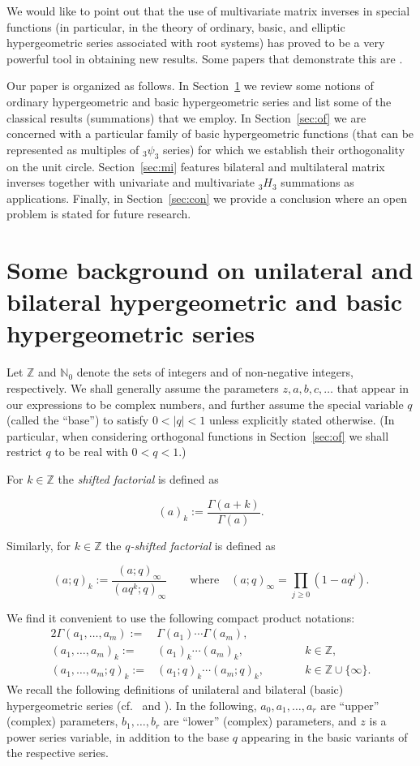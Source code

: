 \documentclass[reqno,12pt]{amsart}
\theoremstyle{remark}
\numberwithin{equation}{section}
\newcommand{\Ga}{\Gamma}
\newcommand{\N}{\mathbb N}
\newcommand{\Z}{\mathbb Z}
\begin{document}
We would like to point out that the use of multivariate matrix inverses
in special functions (in particular, in the theory of ordinary, basic,
and elliptic hypergeometric series associated with root systems)
has proved to be a very powerful tool in obtaining new results.
Some papers that demonstrate this are
\cite{B,BM,BS,C,CG,DJ,KS,LS1,LS2,LM,M2,ML,R,Ro,RS,S1,S2,S5,S6,S7,SW,ZW}.

Our paper is organized as follows. In Section~\ref{sec:sb}
we review some notions of ordinary hypergeometric and basic
hypergeometric series and list some of the classical results (summations)
that we employ. In Section~\ref{sec:of} we are concerned with a
particular family of basic hypergeometric functions (that can be represented
as multiples of $_3\psi_3$ series) for which we establish their orthogonality
on the unit circle. Section~\ref{sec:mi} features bilateral and
multilateral matrix inverses together with univariate and multivariate
$_3H_3$ summations as applications. Finally, in Section~\ref{sec:con}
we provide a conclusion where an open problem is stated for future
research.

\section{Some background on unilateral and bilateral
hypergeometric and basic hypergeometric series}\label{sec:sb}
Let $\Z$ and $\N_0$ denote the sets of integers and of non-negative integers,
respectively. We shall generally assume the parameters $z,a,b,c,\ldots$
that appear in our expressions to be complex numbers,
and further assume the special variable $q$ (called the ``base'')
to satisfy $0<|q|<1$ unless explicitly stated otherwise.
(In particular, when considering orthogonal functions in
Section~\ref{sec:of} we shall restrict $q$ to be real
with $0<q<1$.)

For $k\in\Z$
the \textit{shifted factorial} is defined as

\[
(a)_k:=\frac{\Gamma(a+k)}{\Gamma(a)}.
\]

Similarly, for $k\in\Z$
the \textit{$q$-shifted factorial} is defined as

\[
(a;q)_k:=\frac{(a;q)_\infty}{(aq^k;q)_\infty}\qquad\text{where}\quad
(a;q)_\infty=\prod_{j\ge 0}(1-a q^j).
\]

We find it convenient to use the following compact product notations:
\begin{alignat*}{2}
\Ga(a_1,\dots,a_m):={}&\Ga(a_1)\dotsm\Ga(a_m),&&\\
(a_1,\dots,a_m)_k:={}&(a_1)_k\dotsm(a_m)_k, &&k\in\Z,\\
(a_1,\dots,a_m;q)_k:={}&(a_1;q)_k\dotsm(a_m;q)_k, \qquad&&
k\in\Z\cup\{\infty\}.
\end{alignat*}
We recall the following definitions of unilateral and bilateral 
(basic) hypergeometric series (cf.\ \cite{Sl} and \cite{GR}).
In the following, $a_0,a_1,\ldots,a_r$ are ``upper''
(complex) parameters, $b_1,\ldots,b_r$ are ``lower''
(complex) parameters, and $z$ is a power series variable,
in addition to the base $q$ appearing in the basic variants of
the respective series.
\end{document}

